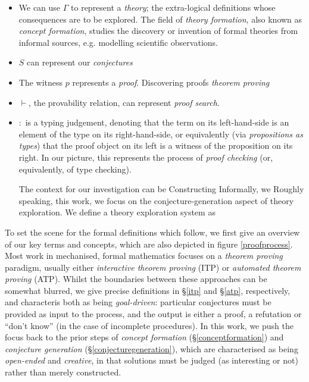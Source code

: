 \documentclass[]{article}
\begin{document}
\begin{itemize}
  \item We can use $\Gamma$ to represent a \emph{theory}; the extra-logical definitions whose consequences are to be explored. The field of \emph{theory formation}, also known as \emph{concept formation}, studies the discovery or invention of formal theories from informal sources, e.g. modelling scientific observations.
  \item $S$ can represent our \emph{conjectures}
  \item The witness $p$ represents a \emph{proof}. Discovering proofs \emph{theorem proving}
  \item $\vdash$, the provability relation, can represent \emph{proof search}.
  \item $:$ is a typing judgement, denoting that the term on its left-hand-side is an element of the type on its right-hand-side, or equivalently (via \emph{propositions as types}) that the proof object on its left is a witness of the proposition on its right. In our picture, this represents the process of \emph{proof checking} (or, equivalently, of type checking).

The context for our investigation can be Constructing  Informally, we Roughly speaking,  this work, we focus on the conjecture-generation aspect of theory exploration. We define a theory exploration system as
\end{itemize}

\fi




To set the scene for the formal definitions which follow, we first give an overview of our key terms and concepts, which are also depicted in figure \ref{proofprocess}. Most work in mechanised, formal mathematics focuses on a \emph{theorem proving} paradigm, usually either \emph{interactive theorem proving} (ITP) or \emph{automated theorem proving} (ATP). Whilst the boundaries between these approaches can be somewhat blurred, we give precise definitions in \S \ref{itp} and \S \ref{atp}, respectively, and characteris both as being \emph{goal-driven}: particular conjectures must be provided as input to the process, and the output is either a proof, a refutation or ``don't know'' (in the case of incomplete procedures). In this work, we push the focus back to the prior steps of \emph{concept formation} (\S \ref{conceptformation}) and \emph{conjecture generation} (\S \ref{conjecturegeneration}), which are characterised as being \emph{open-ended} and \emph{creative}, in that solutions must be judged (as interesting or not) rather than merely constructed.
\end{document}
